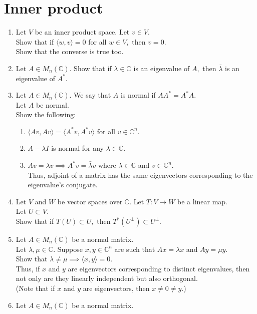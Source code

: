 \documentclass{article}
\begin{document}
\section{Inner product}
\begin{enumerate} 
	\item Let $V$ be an inner product space. Let $v \in V.$\\
	Show that if $\langle w, v\rangle = 0$ for all $w \in V,$ then $v = 0.$\\
	Show that the converse is true too.
	\item Let $A \in M_n(\mathbb{C}).$ Show that if $\lambda \in \mathbb{C}$ is an eigenvalue of $A,$ then $\bar{\lambda}$ is an eigenvalue of $A^*.$
	\item Let $A \in M_n(\mathbb{C}).$ We say that $A$ is normal if $AA^* = A^*A.$\\
	Let $A$ be normal.\\
	Show the following:
	\begin{enumerate} 
		\item $\langle Av, Av\rangle = \langle A^*v, A^*v\rangle$ for all $v \in \mathbb{C}^n.$
		\item $A - \lambda I$ is normal for any $\lambda \in \mathbb{C}.$
		\item $Av = \lambda v \implies A^*v = \bar{\lambda} v$ where $\lambda \in \mathbb{C}$ and $v \in \mathbb{C}^n.$\\
		Thus, adjoint of a matrix has the same eigenvectors corresponding to the eigenvalue's conjugate.
	\end{enumerate}
	\item Let $V$ and $W$ be vector spaces over $\mathbb{C}.$ Let $T:V\to W$ be a linear map.\\
	Let $U \subset V.$\\
	Show that if $T(U) \subset U,$ then $T^*(U^\perp) \subset U^\perp.$
	\item Let $A \in M_n(\mathbb{C})$ be a normal matrix.\\
	Let $\lambda, \mu \in \mathbb{C}.$ Suppose $x, y \in \mathbb{C}^n$ are such that $Ax = \lambda x$ and $Ay = \mu y.$\\
	Show that $\lambda \neq \mu \implies \langle x, y\rangle = 0.$\\
	Thus, if $x$ and $y$ are eigenvectors corresponding to distinct eigenvalues, then not only are they linearly independent but also orthogonal.\\
	(Note that if $x$ and $y$ are eigenvectors, then $x \neq 0 \neq y.$)
	\item Let $A \in M_n(\mathbb{C})$ be a normal matrix.\\

\end{enumerate}
\end{document}
